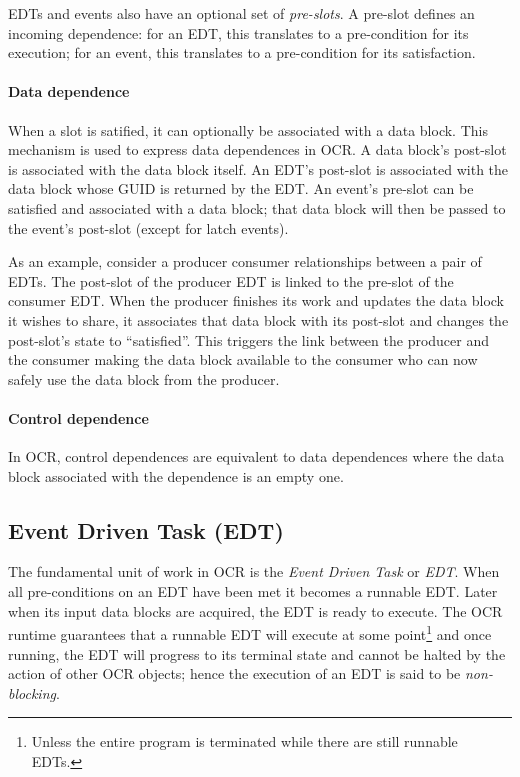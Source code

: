 EDTs and events also have an optional set of
\emph{pre-slots}. A pre-slot defines an incoming
dependence: for an EDT, this translates to a pre-condition for its
execution; for an event, this translates to a pre-condition for its
satisfaction.
\paragraph{Data dependence}
When a slot is satified, it can optionally be associated with a data
block. This mechanism is used to express data dependences in OCR. A
data block's post-slot is associated with the data block itself. An
EDT's post-slot is associated with the data block whose GUID is
returned by the EDT. An event's pre-slot can be satisfied and
associated with a data block; that data block will then be passed to
the event's post-slot (except for latch events).

As an example,
consider a producer consumer relationships between a pair of EDTs. The post-slot of the producer
EDT is linked to the pre-slot of the consumer EDT. When the producer
finishes its work and updates the data block it wishes to share, it
associates that data block with its post-slot and changes the
post-slot's state to ``satisfied''. This triggers the link between the
producer and the consumer making the data block available to the
consumer who can now safely use the data block from the producer.
\paragraph{Control dependence}
In OCR, control dependences are equivalent to data dependences where
the data block associated with the dependence is an empty one.
\subsection{Event Driven Task (EDT)}
\label{sec:EDT}
The fundamental unit of work in OCR is
the \emph{Event Driven Task} or \emph{EDT}.
When all pre-conditions on an EDT have been met it becomes a runnable EDT.
Later when its input data blocks are acquired, the EDT is ready to
execute. The OCR runtime guarantees that a runnable EDT will execute
at some point\footnote{Unless the entire program is terminated while there are
still runnable EDTs.} and once running, the EDT will progress to its terminal state
and cannot be halted by the action of other OCR objects; hence the
execution of an EDT is said to be \emph{non-blocking}.


